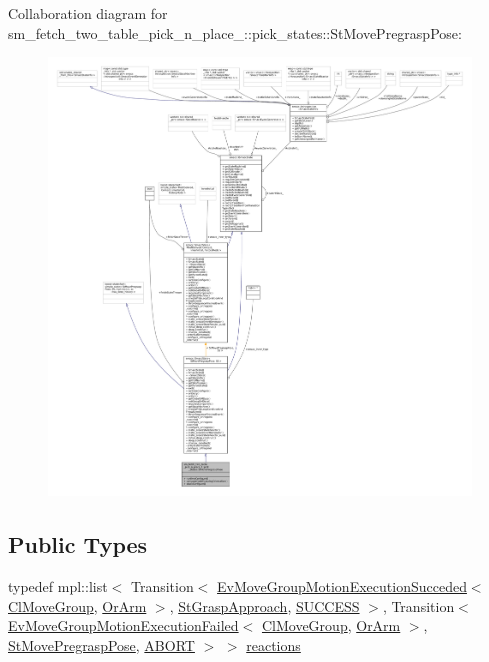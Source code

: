 Collaboration diagram for sm\+\_\+fetch\+\_\+two\+\_\+table\+\_\+pick\+\_\+n\+\_\+place\+\_\+:\+:pick\+\_\+states\+:\+:St\+Move\+Pregrasp\+Pose\+:
\nopagebreak
\begin{figure}[H]
\begin{center}
\leavevmode
\includegraphics[width=350pt]{structsm__fetch__two__table__pick__n__place__1_1_1pick__states_1_1StMovePregraspPose__coll__graph}
\end{center}
\end{figure}
\subsection*{Public Types}
\begin{DoxyCompactItemize}
\item 
typedef mpl\+::list$<$ Transition$<$ \hyperlink{structcl__move__group__interface_1_1EvMoveGroupMotionExecutionSucceded}{Ev\+Move\+Group\+Motion\+Execution\+Succeded}$<$ \hyperlink{classcl__move__group__interface_1_1ClMoveGroup}{Cl\+Move\+Group}, \hyperlink{classsm__fetch__two__table__pick__n__place__1_1_1OrArm}{Or\+Arm} $>$, \hyperlink{structsm__fetch__two__table__pick__n__place__1_1_1pick__states_1_1StGraspApproach}{St\+Grasp\+Approach}, \hyperlink{classSUCCESS}{S\+U\+C\+C\+E\+SS} $>$, Transition$<$ \hyperlink{structcl__move__group__interface_1_1EvMoveGroupMotionExecutionFailed}{Ev\+Move\+Group\+Motion\+Execution\+Failed}$<$ \hyperlink{classcl__move__group__interface_1_1ClMoveGroup}{Cl\+Move\+Group}, \hyperlink{classsm__fetch__two__table__pick__n__place__1_1_1OrArm}{Or\+Arm} $>$, \hyperlink{structsm__fetch__two__table__pick__n__place__1_1_1pick__states_1_1StMovePregraspPose}{St\+Move\+Pregrasp\+Pose}, \hyperlink{classABORT}{A\+B\+O\+RT} $>$ $>$ \hyperlink{structsm__fetch__two__table__pick__n__place__1_1_1pick__states_1_1StMovePregraspPose_ad3f8e68560da077ae5d5eb9a2f8a38be}{reactions}
\end{DoxyCompactItemize}
